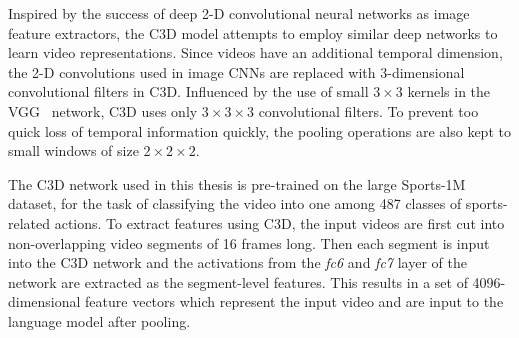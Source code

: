 Inspired by the success of deep 2-D convolutional neural networks as image
feature extractors, the C3D model attempts to employ similar deep networks to learn
video representations.
Since videos have an additional temporal dimension, the 2-D convolutions
used in image CNNs are replaced with 3-dimensional convolutional filters in C3D.
Influenced by the use of small $3\times3$ kernels in the VGG~\cite{Simonyan14c}
network, C3D uses only $3\times3\times3$ convolutional filters.
To prevent too quick loss of temporal information quickly, the pooling
operations are also kept to small windows of size $2\times2\times2$.

The C3D network used in this thesis is pre-trained on the large Sports-1M
dataset, for the task of classifying the video into one among 487 classes of
sports-related actions.
To extract features using C3D, the input videos are first cut into non-overlapping
video segments of 16 frames long.
Then each segment is input into the C3D network and the activations from the
\emph{fc6} and \emph{fc7} layer of the network are extracted as the segment-level
features.
This results in a set of 4096-dimensional feature vectors which represent the
input video and are input to the language model after pooling.



